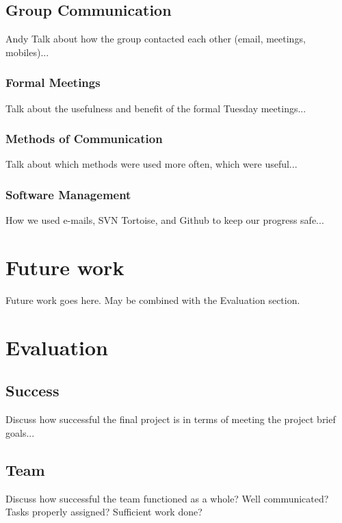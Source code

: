 \documentclass[oneside]{ecsgdp}         %
\begin{document}
\section{Group Communication}
Andy
Talk about how the group contacted each other (email, meetings, mobiles)...

\subsection{Formal Meetings}
Talk about the usefulness and benefit of the formal Tuesday meetings...

\subsection{Methods of Communication}
Talk about which methods were used more often, which were useful...

\subsection{Software Management}
How we used e-mails, SVN Tortoise, and Github to keep our progress safe...


\chapter{Future work}
Future work goes here. May be combined with the Evaluation section.

\chapter{Evaluation}

\section{Success}
Discuss how successful the final project is in terms of meeting the project brief goals...

\section{Team}
Discuss how successful the team functioned as a whole? Well communicated? Tasks properly assigned? Sufficient work done?
\end{document}
